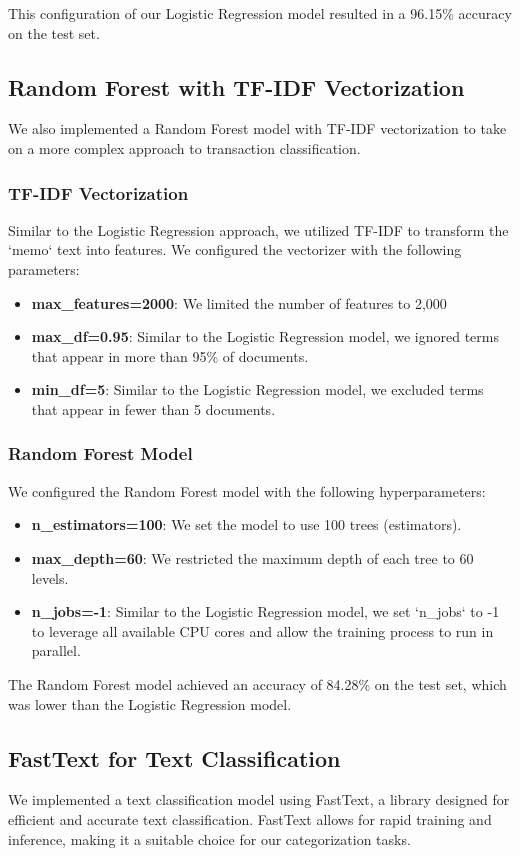\documentclass[12pt,letterpaper]{article}
\begin{document}
This configuration of our Logistic Regression model resulted in a 96.15\% accuracy on the test set.

\subsection{Random Forest with TF-IDF Vectorization}
We also implemented a Random Forest model with TF-IDF vectorization to take on a more complex approach to transaction classification.

\subsubsection{TF-IDF Vectorization}
Similar to the Logistic Regression approach, we utilized TF-IDF to transform the `memo` text into features. We configured the vectorizer with the following parameters:
\begin{itemize}
    \item \textbf{max\_features=2000}: We limited the number of features to 2,000
    \item \textbf{max\_df=0.95}: Similar to the Logistic Regression model, we ignored terms that appear in more than 95\% of documents.
    \item \textbf{min\_df=5}: Similar to the Logistic Regression model, we excluded terms that appear in fewer than 5 documents.
\end{itemize}

\subsubsection{Random Forest Model}
We configured the Random Forest model with the following hyperparameters:
\begin{itemize}
    \item \textbf{n\_estimators=100}: We set the model to use 100 trees (estimators).
    \item \textbf{max\_depth=60}: We restricted the maximum depth of each tree to 60 levels.
    \item \textbf{n\_jobs=-1}: Similar to the Logistic Regression model, we set `n\_jobs` to -1 to leverage all available CPU cores and allow the training process to run in parallel.
\end{itemize}

The Random Forest model achieved an accuracy of 84.28\% on the test set, which was lower than the Logistic Regression model.

\subsection{FastText for Text Classification}
We implemented a text classification model using FastText, a library designed for efficient and accurate text classification. FastText allows for rapid training and inference, making it a suitable choice for our categorization tasks. 
\end{document}
